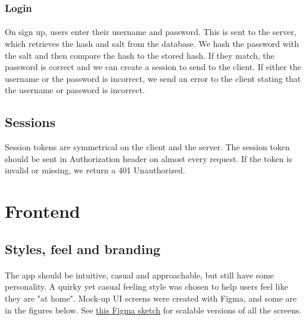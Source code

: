 \documentclass{report}
\begin{document}
\subsubsection{Login}
\paragraph{}
On sign up, users enter their username and password. This is sent to the server, which retrieves the hash and salt from the database. We hash the password with the salt and then compare the hash to the stored hash. If they match, the password is correct and we can create a session to send to the client. If either the username or the password is incorrect, we send an error to the client stating that the username or password is incorrect.

\subsection{Sessions}
Session tokens are symmetrical on the client and the server. The session token should be sent in Authorization header on almost every request. If the token is invalid or missing, we return a 401 Unauthorized.

\section{Frontend}
\subsection{Styles, feel and branding}
\paragraph{}
The app should be intuitive, casual and approachable, but still have some personality. A quirky yet casual feeling style was chosen to help users feel like they are "at home". Mock-up UI screens were created with Figma, and some are in the figures below. See \href{https://www.figma.com/file/7vs7errfunZKlr1wT6j52Z/faded}{this Figma sketch} for scalable versions of all the screens.
\end{document}
